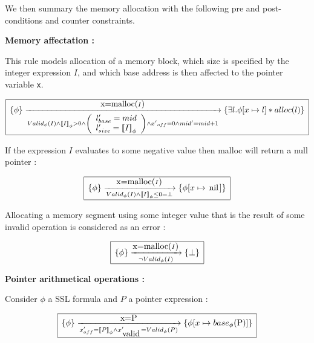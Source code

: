 \documentclass[a4paper,twoside,12pt]{report}
\newcommand{\Alloc}[1]{alloc(#1)}
\newcommand{\Unsep}[0]{\ast}
\newcommand{\Sep}[2]{#1 \Unsep #2}
\newcommand{\Pointsto}[2]{ #1 \mapsto #2}
\newcommand{\nil}[0]{\lstinline!nil!}
\newcommand{\Addrep}[2]{#1 \lbrack #2 \rbrack}
\newcommand{\base}[2]{base_{#1}(#2)}
\newcommand{\lbase}[1]{#1_{base}}
\newcommand{\lsize}[1]{#1_{size}}
\newcommand{\locvar}[3]{
\left ( \begin{array}{l}
\lbase{#1}=#2 \\
\lsize{#1}=#3
\end{array} \right )
}
\newcommand{\transmodel}[4]{\lbrace #1 \rbrace \arrow{#2}{#3} \lbrace #4 \rbrace }
\newcommand{\ptroffset}[1]{{#1}_{off}}
\newcommand{\gmallocid}[0]{mid}
\newcommand{\valid}[1]{{#1}_{\mbox{\lstinline!valid!}}}
\newcommand{\isvalid}[2]{Valid_{#1}(#2)}
\newcommand{\interpa}[2]{\sem{#2}_{#1}}
\begin{document}
We then summary the memory allocation with the following pre and post-conditions and counter constraints.

\textbf{Memory affectation :}

This rule models allocation of a memory block, which size is specified by the
integer expression $I$, and which base address is then affected to the
pointer variable \lstinline!x!.

$$
\begin{array}{|l|}
\hline
\transmodel{\phi}{\mbox{\lstinline!x=malloc(!} I \mbox{\lstinline!)!}}{\isvalid{\phi}{I} \wedge \interpa{\phi}{I} > 0 \wedge \locvar{l^{\prime}}{\gmallocid}{\interpa{\phi}{I}} \wedge \ptroffset{x^{\prime}}=0 \wedge \gmallocid^{\prime}=\gmallocid + 1}{\Sep{\exists l. \Addrep{\phi}{\Pointsto{x}{l}}}{\Alloc{l}}} \\
\hline
\end{array}
$$ 

If the expression $I$ evaluates to some negative value then malloc will return a null pointer :

$$
\begin{array}{|l|}
\hline
\transmodel{\phi}{\mbox{\lstinline!x=malloc(!} I \mbox{\lstinline!)!}}{\isvalid{\phi}{I} \wedge \interpa{\phi}{I} \leq 0 = \bot}{\Addrep{\phi}{\Pointsto{x}{\nil}}} \\
\hline
\end{array}
$$ 

Allocating a memory segment using some integer value that is the result of some
invalid operation is considered as an error :

$$
\begin{array}{|l|}
\hline
\transmodel{\phi}{\mbox{\lstinline!x=malloc(!} I \mbox{\lstinline!)!}}{\neg \isvalid{\phi}{I}}{\bot} \\
\hline
\end{array}
$$ 


\textbf{Pointer arithmetical operations :}

Consider $\phi$ a SSL formula and $P$ a pointer expression :

$$
\begin{array}{|l|}
\hline
\transmodel{\phi}{\mbox{x=P}}{\ptroffset{x}^{\prime}=\interpa{\phi}{P} \wedge \valid{x}^{\prime}=\isvalid{\phi}{P}}{\Addrep{\phi}{\Pointsto{x}{\base{\phi}{\mbox{\lstinline!P!}}}}} \\
\hline
\end{array}
$$ 
\end{document}
